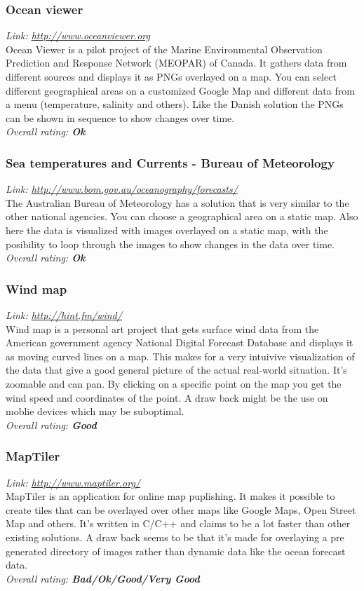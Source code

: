 \documentclass[11pt,a4paper,titlepage,oneside]{report}
\begin{document}
\subsubsection{Ocean viewer}
\emph{Link: \url{http://www.oceanviewer.org}} \\%
  Ocean Viewer is a pilot project of the Marine Environmental Observation Prediction and Response Network (MEOPAR) of Canada. It gathers data from different sources and displays it as PNGs overlayed on a map. You can select different geographical areas on a customized Google Map and different data from a menu (temperature, salinity and others). Like the Danish solution the PNGs can be shown in sequence to show changes over time.
\\ \emph{Overall rating: \textbf{Ok}}

\subsubsection{Sea temperatures and Currents - Bureau of Meteorology}
\emph{Link: \url{http://www.bom.gov.au/oceanography/forecasts/}} \\%
  The Australian Bureau of Meteorology has a solution that is very similar to the other national agencies. You can choose a geographical area on a static map. Also here the data is visualized with images overlayed on a static map, with the posibility to loop through the images to show changes in the data over time.
\\ \emph{Overall rating: \textbf{Ok}}

\subsubsection{Wind map}
\emph{Link: \url{http://hint.fm/wind/}} \\%
  Wind map is a personal art project that gets surface wind data from the American government agency National Digital Forecast Database and displays it as moving curved lines on a map. This makes for a very intuivive visualization of the data that give a good general picture of the actual real-world situation. It's zoomable and can pan. By clicking on a specific point on the map you get the wind speed and coordinates of the point. A draw back might be the use on moblie devices which may be suboptimal.
\\ \emph{Overall rating: \textbf{Good}}

\subsubsection{MapTiler}
\emph{Link: \url{http://www.maptiler.org/}} \\%
  MapTiler is an application for online map puplishing. It makes it possible to create tiles that can be overlayed over other maps like Google Maps, Open Street Map and others. It's written in C/C++ and claims to be a lot faster than other existing solutions. A draw back seems to be that it's made for overlaying a pre generated directory of images rather than dynamic data like the ocean forecast data.
\\ \emph{Overall rating: \textbf{Bad/Ok/Good/Very Good}}
\end{document}
